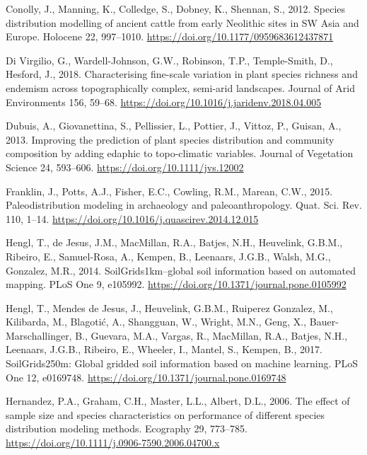 \documentclass[
  number,
  review]{elsarticle}
\newlength{\cslhangindent}
\newenvironment{CSLReferences}[2] %
 {\begin{list}{}{%
  \setlength{\itemindent}{0pt}
  \setlength{\leftmargin}{0pt}
  \setlength{\parsep}{0pt}
  \ifodd #1
   \setlength{\leftmargin}{\cslhangindent}
   \setlength{\itemindent}{-1\cslhangindent}
  \fi
  \setlength{\itemsep}{#2\baselineskip}}}
 {\end{list}}
\begin{document}
\begin{CSLReferences}{1}{0}
Conolly, J., Manning, K., Colledge, S., Dobney, K., Shennan, S., 2012.
Species distribution modelling of ancient cattle from early {Neolithic}
sites in {SW Asia} and {Europe}. Holocene 22, 997--1010.
\url{https://doi.org/10.1177/0959683612437871}

Di Virgilio, G., Wardell-Johnson, G.W., Robinson, T.P., Temple-Smith,
D., Hesford, J., 2018. Characterising fine-scale variation in plant
species richness and endemism across topographically complex, semi-arid
landscapes. Journal of Arid Environments 156, 59--68.
\url{https://doi.org/10.1016/j.jaridenv.2018.04.005}

Dubuis, A., Giovanettina, S., Pellissier, L., Pottier, J., Vittoz, P.,
Guisan, A., 2013. Improving the prediction of plant species distribution
and community composition by adding edaphic to topo-climatic variables.
Journal of Vegetation Science 24, 593--606.
\url{https://doi.org/10.1111/jvs.12002}

Franklin, J., Potts, A.J., Fisher, E.C., Cowling, R.M., Marean, C.W.,
2015. Paleodistribution modeling in archaeology and paleoanthropology.
Quat. Sci. Rev. 110, 1--14.
\url{https://doi.org/10.1016/j.quascirev.2014.12.015}

Hengl, T., de Jesus, J.M., MacMillan, R.A., Batjes, N.H., Heuvelink,
G.B.M., Ribeiro, E., Samuel-Rosa, A., Kempen, B., Leenaars, J.G.B.,
Walsh, M.G., Gonzalez, M.R., 2014. {SoilGrids1km--global} soil
information based on automated mapping. PLoS One 9, e105992.
\url{https://doi.org/10.1371/journal.pone.0105992}

Hengl, T., Mendes de Jesus, J., Heuvelink, G.B.M., Ruiperez Gonzalez,
M., Kilibarda, M., Blagotić, A., Shangguan, W., Wright, M.N., Geng, X.,
Bauer-Marschallinger, B., Guevara, M.A., Vargas, R., MacMillan, R.A.,
Batjes, N.H., Leenaars, J.G.B., Ribeiro, E., Wheeler, I., Mantel, S.,
Kempen, B., 2017. {SoilGrids250m}: {Global} gridded soil information
based on machine learning. PLoS One 12, e0169748.
\url{https://doi.org/10.1371/journal.pone.0169748}

Hernandez, P.A., Graham, C.H., Master, L.L., Albert, D.L., 2006. The
effect of sample size and species characteristics on performance of
different species distribution modeling methods. Ecography 29, 773--785.
\url{https://doi.org/10.1111/j.0906-7590.2006.04700.x}


\end{CSLReferences}
\end{document}
